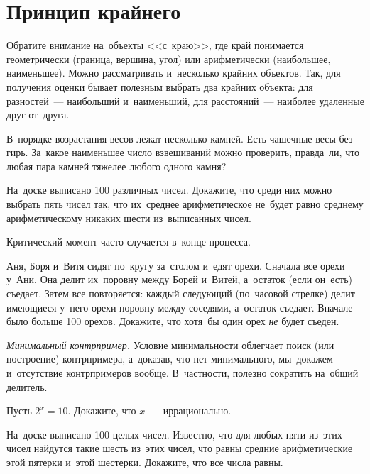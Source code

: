 
\section*{Принцип крайнего}



Обратите внимание на~объекты <<с~краю>>, где край понимается геометрически
(граница, вершина, угол) или арифметически (наибольшее, наименьшее).
Можно рассматривать и~несколько крайних объектов.
Так, для получения оценки бывает полезным выбрать два крайних объекта: для
разностей~--- наибольший и~наименьший, для расстояний~--- наиболее удаленные
друг от~друга.

\begin{problems}

\item
В~порядке возрастания весов лежат несколько камней.
Есть чашечные весы без гирь.
За~какое наименьшее число взвешиваний можно проверить, правда~ли, что любая пара
камней тяжелее любого одного камня?

\item
На~доске выписано 100 различных чисел.
Докажите, что среди них можно выбрать пять чисел так, что их~среднее
арифметическое не~будет равно среднему арифметическому никаких шести
из~выписанных чисел.

\end{problems}

Критический момент часто случается в~конце процесса.

\begin{problems}

\item
Аня, Боря и~Витя сидят по~кругу за~столом и~едят орехи.
Сначала все орехи у~Ани.
Она делит их~поровну между Борей и~Витей, а~остаток (если он~есть) съедает.
Затем все повторяется: каждый следующий (по~часовой стрелке) делит имеющиеся
у~него орехи поровну между соседями, а~остаток съедает.
Вначале было больше 100 орехов.
Докажите, что хотя~бы один орех \emph{не} будет съеден.

\end{problems}

\emph{Минимальный контрпример.}
Условие минимальности облегчает поиск (или построение) контрпримера, а~доказав,
что нет минимального, мы~докажем и~отсутствие контрпримеров вообще.
В~частности, полезно сократить на~общий делитель.

\begin{problems}

\item
Пусть $2^x = 10$.
Докажите, что $x$~--- иррационально.

\item
На~доске выписано 100 целых чисел.
Известно, что для любых пяти из~этих чисел найдутся такие шесть из~этих чисел,
что равны средние арифметические этой пятерки и~этой шестерки.
Докажите, что все числа равны.

\end{problems}

